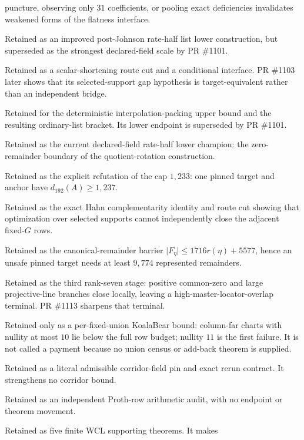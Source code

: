 \documentclass[11pt]{article}
\begin{document}
\begin{description}
  puncture, observing only \(31\) coefficients, or pooling exact deficiencies
  invalidates weakened forms of the flatness interface.
\item[PR \#1097.] Retained as an improved post-Johnson rate-half list lower
  construction, but superseded as the strongest declared-field scale by
  PR \#1101.
\item[PR \#1098.] Retained as a scalar-shortening route cut and a conditional
  interface.  PR \#1103 later shows that its selected-support gap hypothesis is
  target-equivalent rather than an independent bridge.
\item[PR \#1099.] Retained for the deterministic interpolation-packing upper
  bound and the resulting ordinary-list bracket.  Its lower endpoint is
  superseded by PR \#1101.
\item[PR \#1101.] Retained as the current declared-field rate-half lower
  champion: the zero-remainder boundary of the quotient-rotation construction.
\item[PR \#1102.] Retained as the explicit refutation of the cap \(1{,}233\):
  one pinned target and anchor have \(d_{192}(A)\ge1{,}237\).
\item[PR \#1103.] Retained as the exact Hahn complementarity identity and route
  cut showing that optimization over selected supports cannot independently
  close the adjacent fixed-\(G\) rows.
\item[PR \#1104.] Retained as the canonical-remainder barrier
  \(\lvert F_\eta\rvert\le1716r(\eta)+5577\), hence an unsafe pinned target
  needs at least \(9{,}774\) represented remainders.
\item[PR \#1105.] Retained as the third rank-seven stage: positive common-zero
  and large projective-line branches close locally, leaving a
  high-master-locator-overlap terminal.  PR \#1113 sharpens that terminal.
\item[PR \#1106.] Retained only as a per-fixed-union KoalaBear bound:
  column-far charts with nullity at most \(10\) lie below the full row budget;
  nullity \(11\) is the first failure.  It is not called a payment because no
  union census or add-back theorem is supplied.
\item[PR \#1107.] Retained as a literal admissible corridor-field pin and exact
  rerun contract.  It strengthens no corridor bound.
\item[PR \#1108.] Retained as an independent Proth-row arithmetic audit, with
  no endpoint or theorem movement.
\item[PR \#1109.] Retained as five finite WCL supporting theorems.  It makes

\end{description}
\end{document}
